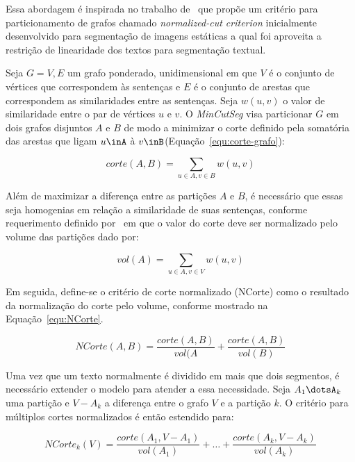 Essa abordagem é inspirada no trabalho de~\cite{Shi2000} que propõe um critério para particionamento de grafos chamado \textit{normalized-cut criterion} inicialmente desenvolvido para segmentação de imagens estáticas a qual foi aproveita a restrição de linearidade dos textos para segmentação textual.

Seja $G = {V,E}$ um grafo ponderado, unidimensional em que $V$ é o conjunto de vértices que correspondem às sentenças e $E$ é o conjunto de arestas que correspondem as similaridades entre as sentenças. Seja $w(u, v)$ o valor de similaridade entre o par de vértices $u$ e $v$. O \textit{MinCutSeg} visa particionar $G$ em dois grafos disjuntos $A$ e $B$ de modo a minimizar o corte definido pela somatória das arestas que ligam $u\inA$ à $v\inB$(Equação~\ref{equ:corte-grafo}):

\begin{equation} 
	corte(A,B) = \sum_{u \in A,v \in B} w(u, v) 
	\label{equ:corte-grafo}
\end{equation}



Além de maximizar a diferença entre as partições $A$ e $B$, é necessário que essas seja homogenias em relação a similaridade de suas sentenças, conforme requerimento definido por~\cite{Shi2000} em que o valor do corte deve ser normalizado pelo volume das partições dado por:

\begin{equation}
	vol(A) = \sum_{u \in A, v \in V} w(u, v)
\end{equation}


Em seguida, define-se o critério de corte normalizado (NCorte) como o resultado da normalização do corte pelo volume, conforme mostrado na Equação~\ref{equ:NCorte}.

\begin{equation}
	NCorte(A,B) = \frac{corte(A,B)}{vol(A} + \frac{corte(A,B)}{vol(B)}
	\label{equ:NCorte}
\end{equation}


Uma vez que um texto normalmente é dividido em mais que dois segmentos, é necessário extender o modelo para atender a essa necessidade. Seja $A_1\dotsA_k$ uma partição e $V - A_k$ a diferença entre o grafo $V$ e a partição $k$. O critério para múltiplos cortes normalizados é então estendido para: 

\begin{equation} 
	NCorte_k(V) = \frac{corte(A_1, V-A_1)}{vol(A_1)} + \dots + \frac{corte(A_k, V-A_k)}{vol(A_k)} 
	\label{equ:NCorte-k}
\end{equation}


